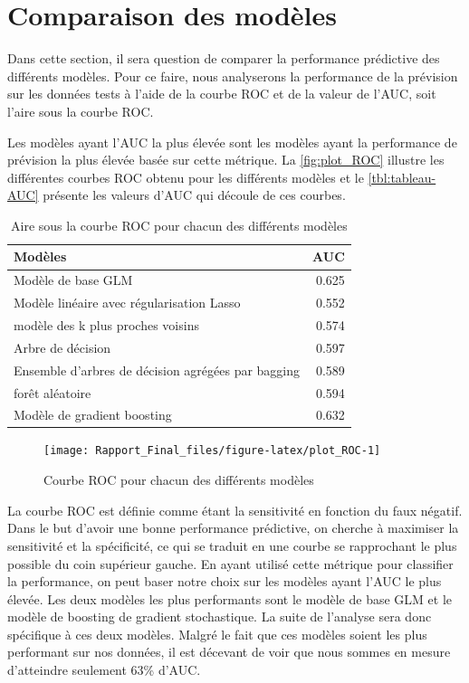 \documentclass[]{article}
\begin{document}
\newpage

\section{Comparaison des modèles}\label{comparaison-des-moduxe8les}

Dans cette section, il sera question de comparer la performance
prédictive des différents modèles. Pour ce faire, nous analyserons la
performance de la prévision sur les données tests à l'aide de la courbe
ROC et de la valeur de l'AUC, soit l'aire sous la courbe ROC.

Les modèles ayant l'AUC la plus élevée sont les modèles ayant la
performance de prévision la plus élevée basée sur cette métrique. La
\autoref{fig:plot_ROC} illustre les différentes courbes ROC obtenu pour
les différents modèles et le \autoref{tbl:tableau-AUC} présente les
valeurs d'AUC qui découle de ces courbes.

\begin{table}[ht]
\centering
\caption{Aire sous la courbe ROC pour chacun des différents modèles} 
\label{tbl:tableau-AUC}
\begin{tabular}{lr}
  \hline
Modèles & AUC \\ 
  \hline
Modèle de base GLM & 0.625 \\ 
  Modèle linéaire avec régularisation Lasso & 0.552 \\ 
  modèle des k plus proches voisins & 0.574 \\ 
  Arbre de décision & 0.597 \\ 
  Ensemble d'arbres de décision agrégées par bagging & 0.589 \\ 
  forêt aléatoire & 0.594 \\ 
  Modèle de gradient boosting & 0.632 \\ 
   \hline
\end{tabular}
\end{table}

\begin{figure}

{\centering \texttt{[image: Rapport\_Final\_files/figure-latex/plot\_ROC-1]} 

}

\caption{Courbe ROC pour chacun des différents modèles}\label{fig:plot_ROC}
\end{figure}

La courbe ROC est définie comme étant la sensitivité en fonction du faux
négatif. Dans le but d'avoir une bonne performance prédictive, on
cherche à maximiser la sensitivité et la spécificité, ce qui se traduit
en une courbe se rapprochant le plus possible du coin supérieur gauche.
En ayant utilisé cette métrique pour classifier la performance, on peut
baser notre choix sur les modèles ayant l'AUC le plus élevée. Les deux
modèles les plus performants sont le modèle de base GLM et le modèle de
boosting de gradient stochastique. La suite de l'analyse sera donc
spécifique à ces deux modèles. Malgré le fait que ces modèles soient les
plus performant sur nos données, il est décevant de voir que nous sommes
en mesure d'atteindre seulement 63\% d'AUC.
\end{document}
